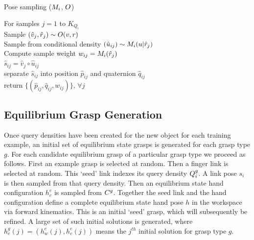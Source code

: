 \begin{algorithmbox}[floatplacement=t,float,fontupper=\small,label={alg:mc}]{Pose sampling ($M_i${,} $O$)}
\begin{minipage}{\linewidth}\begin{tabbing}%
For \= samples $j=1$ to $K_{Q_i}$\\
  \> Sample $(\hat{v}_j, \hat{r}_j) \sim O(v, r)$\\
  \> Sample from conditional density $(\hat{u}_{ij}) \sim M_i(u|\hat{r}_j)$\\
	\> Compute sample weight $w_{ij} = M_i(\hat{r}_j)$\\
	\> $\hat{s}_{ij} = \hat{v}_{j} \circ \hat{u}_{ij}$ \\
	\> separate $\hat{s}_{ij}$ into position $\hat{p}_{ij}$ and quaternion $\hat{q}_{ij}$\\
return $\{  (\hat{p}_{ij}, \hat{q}_{ij}, w_{ij} ) \}, \,  \forall j $
\end{tabbing}\end{minipage}
\end{algorithmbox}

\subsection{Equilibrium Grasp Generation} 
Once query densities have been created for the new object for each training example, an initial set of equilibrium state grasps is generated for each grasp type $g$. For each candidate equilibrium grasp of a particular grasp type we proceed as follows. First an example grasp is selected at random. Then a finger link is selected at random. This ‘seed’ link indexes its query density $Q_i^g$. A link pose $s_i$ is then sampled from that query density. Then an equilibrium state hand configuration $h^e_c$ is sampled from $C^g$. Together the seed link and the hand configuration define a complete equilibrium state hand pose $h$ in the workspace via forward kinematics. This is an initial `seed' grasp, which will subsequently be refined. A large set of such initial solutions is generated, where $h_e^g(j)=(h_w^{e}(j) , h_c^{e}(j))$ means the $j^{th}$ initial solution for  grasp type $g$.

